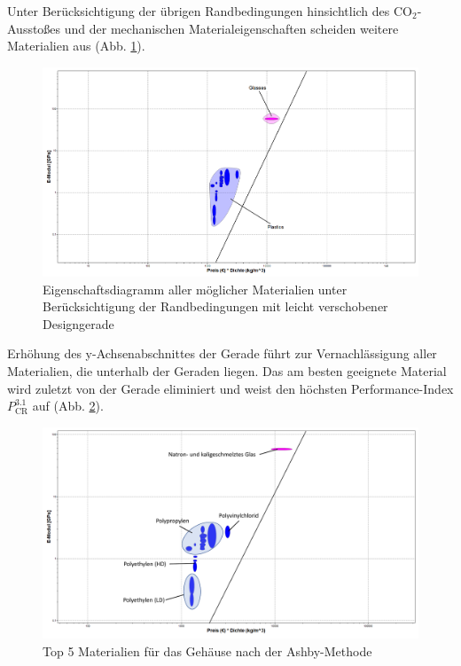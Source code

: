 Unter Berücksichtigung der übrigen Randbedingungen hinsichtlich des CO$_2$-Ausstoßes und der mechanischen Materialeigenschaften scheiden weitere Materialien aus (Abb. \ref{fig:ces_3_1_3}).\\
\begin{figure}[H]
	\centering
	\includegraphics[width=1.0\linewidth]{chapter/Bilder/3_1_3}
	\caption{Eigenschaftsdiagramm aller möglicher Materialien unter Berücksichtigung der Randbedingungen mit leicht verschobener Designgerade}
	\label{fig:ces_3_1_3}
\end{figure}
Erhöhung des y-Achsenabschnittes der Gerade führt zur Vernachlässigung aller Materialien, die unterhalb der Geraden liegen. Das am besten geeignete Material wird zuletzt von der Gerade eliminiert und weist den höchsten Performance-Index $P_{\text{CR}}^{3.1}$ auf (Abb. \ref{fig:ces_3_1_4}).\\
\begin{figure}[H]
	\centering
	\includegraphics[width=1.0\linewidth]{chapter/Bilder/3_1_4}
	\caption{Top 5 Materialien für das Gehäuse nach der Ashby-Methode}
	\label{fig:ces_3_1_4}
\end{figure}

